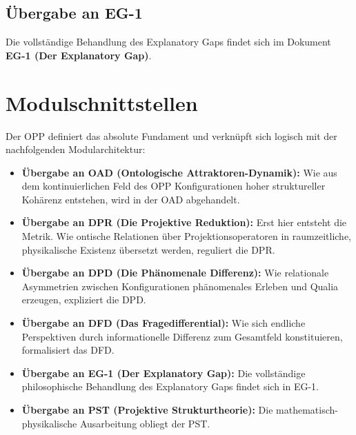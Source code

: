 \documentclass[11pt,a4paper]{article}
\theoremstyle{plain}
\theoremstyle{definition}
\begin{document}
\subsection{\"{U}bergabe an EG-1}

Die vollst\"{a}ndige Behandlung des Explanatory Gaps findet sich im Dokument
\textbf{EG-1 (Der Explanatory Gap)}.

\section{Modulschnittstellen}

Der OPP definiert das absolute Fundament und verkn\"{u}pft sich logisch mit der
nachfolgenden Modularchitektur:

\begin{itemize}
  \item \textbf{\"{U}bergabe an OAD (Ontologische Attraktoren-Dynamik):} Wie aus dem
        kontinuierlichen Feld des OPP Konfigurationen hoher struktureller Koh\"{a}renz
        entstehen, wird in der OAD abgehandelt.
  \item \textbf{\"{U}bergabe an DPR (Die Projektive Reduktion):} Erst hier entsteht
        die Metrik. Wie ontische Relationen \"{u}ber Projektionsoperatoren in
        raumzeitliche, physikalische Existenz \"{u}bersetzt werden, reguliert die DPR.
  \item \textbf{\"{U}bergabe an DPD (Die Ph\"{a}nomenale Differenz):} Wie relationale
        Asymmetrien zwischen Konfigurationen ph\"{a}nomenales Erleben und Qualia
        erzeugen, expliziert die DPD.
  \item \textbf{\"{U}bergabe an DFD (Das Fragedifferential):} Wie sich endliche
        Perspektiven durch informationelle Differenz zum Gesamtfeld konstituieren,
        formalisiert das DFD.
  \item \textbf{\"{U}bergabe an EG-1 (Der Explanatory Gap):} Die vollst\"{a}ndige
        philosophische Behandlung des Explanatory Gaps findet sich in EG-1.
  \item \textbf{\"{U}bergabe an PST (Projektive Strukturtheorie):} Die mathematisch-physikalische
        Ausarbeitung obliegt der PST.
\end{itemize}
\end{document}
